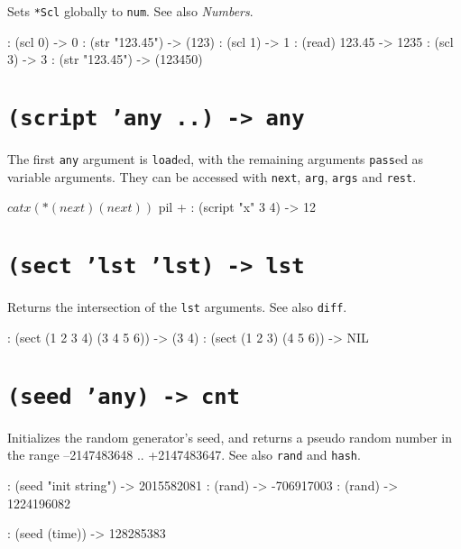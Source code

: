 Sets \texttt{*Scl} globally to \texttt{num}. See also \emph{Numbers}.


\begin{wideverbatim}
: (scl 0)
-> 0
: (str "123.45")
-> (123)
: (scl 1)
-> 1
: (read)
123.45
-> 1235
: (scl 3)
-> 3
: (str "123.45")
-> (123450)
\end{wideverbatim}

 
\section*{\texttt{(script 'any ..) -> any}}
\label{sec:func-ref-S-(script 'any ..) -> any}


The first \texttt{any} argument is \texttt{load}ed, with the remaining arguments \texttt{pass}ed as variable arguments. They can be accessed with \texttt{next}, \texttt{arg},
\texttt{args} and \texttt{rest}.


\begin{wideverbatim}
$ cat x
(* (next) (next))

$ pil +
: (script "x" 3 4)
-> 12
\end{wideverbatim}

 
\section*{\texttt{(sect 'lst 'lst) -> lst}}
\label{sec:func-ref-S-(sect 'lst 'lst) -> lst}


Returns the intersection of the \texttt{lst} arguments. See also \texttt{diff}.


\begin{wideverbatim}
: (sect (1 2 3 4) (3 4 5 6))
-> (3 4)
: (sect (1 2 3) (4 5 6))
-> NIL
\end{wideverbatim}

 
\section*{\texttt{(seed 'any) -> cnt}}
\label{sec:func-ref-S-(seed 'any) -> cnt}


Initializes the random generator's seed, and returns a pseudo random
number in the range --2147483648 .. +2147483647. See also \texttt{rand} and
\texttt{hash}.


\begin{wideverbatim}
: (seed "init string")
-> 2015582081
: (rand)
-> -706917003
: (rand)
-> 1224196082

: (seed (time))
-> 128285383
\end{wideverbatim}

